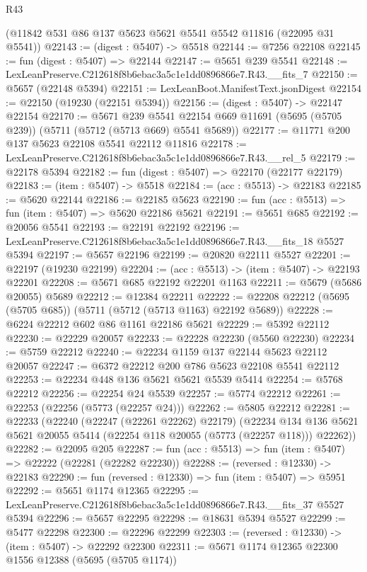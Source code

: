 \begin{lexlean}{R43}
\begin{coremodule}
    (@11842 @531 @86 @137 @5623 @5621 @5541 @5542 @11816 (@22095 @31 @5541))
@22143 := (digest : @5407) -> @5518
@22144 := @7256 @22108
@22145 := fun (digest : @5407) => @22144
@22147 := @5651 @239 @5541
@22148 := LexLeanPreserve.C212618f8b6ebac3a5c1e1dd0896866e7.R43.__fits_7
@22150 := @5657 (@22148 @5394)
@22151 := LexLeanBoot.ManifestText.jsonDigest
@22154 := @22150 (@19230 (@22151 @5394))
@22156 := (digest : @5407) -> @22147 @22154
@22170 := @5671
    @239
    @5541
    @22154
    @669
    @11691
    (@5695 (@5705 @239))
    (@5711 (@5712 (@5713 @669) @5541 @5689))
@22177 := @11771 @200 @137 @5623 @22108 @5541 @22112 @11816
@22178 := LexLeanPreserve.C212618f8b6ebac3a5c1e1dd0896866e7.R43.__rel_5
@22179 := @22178 @5394
@22182 := fun (digest : @5407) => @22170 (@22177 @22179)
@22183 := (item : @5407) -> @5518
@22184 := (acc : @5513) -> @22183
@22185 := @5620 @22144
@22186 := @22185 @5623
@22190 := fun (acc : @5513) => fun (item : @5407) => @5620 @22186 @5621
@22191 := @5651 @685
@22192 := @20056 @5541
@22193 := @22191 @22192
@22196 := LexLeanPreserve.C212618f8b6ebac3a5c1e1dd0896866e7.R43.__fits_18 @5527 @5394
@22197 := @5657 @22196
@22199 := @20820 @22111 @5527
@22201 := @22197 (@19230 @22199)
@22204 := (acc : @5513) -> (item : @5407) -> @22193 @22201
@22208 := @5671 @685 @22192 @22201 @1163
@22211 := @5679 (@5686 @20055) @5689
@22212 := @12384 @22211
@22222 := @22208 @22212 (@5695 (@5705 @685)) (@5711 (@5712 (@5713 @1163) @22192 @5689))
@22228 := @6224 @22212 @602 @86 @1161 @22186 @5621
@22229 := @5392 @22112
@22230 := @22229 @20057
@22233 := @22228 @22230 (@5560 @22230)
@22234 := @5759 @22212
@22240 := @22234 @1159 @137 @22144 @5623 @22112 @20057
@22247 := @6372 @22212 @200 @786 @5623 @22108 @5541 @22112
@22253 := @22234 @448 @136 @5621 @5621 @5539 @5414
@22254 := @5768 @22212
@22256 := @22254 @24 @5539
@22257 := @5774 @22212
@22261 := @22253 (@22256 (@5773 (@22257 @24)))
@22262 := @5805 @22212
@22281 := @22233
    (@22240
      (@22247 (@22261 @22262) @22179)
      (@22234 @134 @136 @5621 @5621 @20055 @5414 (@22254 @118 @20055 (@5773 (@22257 @118))) @22262))
@22282 := @22095 @205
@22287 := fun (acc : @5513) => fun (item : @5407) => @22222 (@22281 (@22282 @22230))
@22288 := (reversed : @12330) -> @22183
@22290 := fun (reversed : @12330) => fun (item : @5407) => @5951
@22292 := @5651 @1174 @12365
@22295 := LexLeanPreserve.C212618f8b6ebac3a5c1e1dd0896866e7.R43.__fits_37 @5527 @5394
@22296 := @5657 @22295
@22298 := @18631 @5394 @5527
@22299 := @5477 @22298
@22300 := @22296 @22299
@22303 := (reversed : @12330) -> (item : @5407) -> @22292 @22300
@22311 := @5671 @1174 @12365 @22300 @1556 @12388 (@5695 (@5705 @1174))

\end{coremodule}
\end{lexlean}

